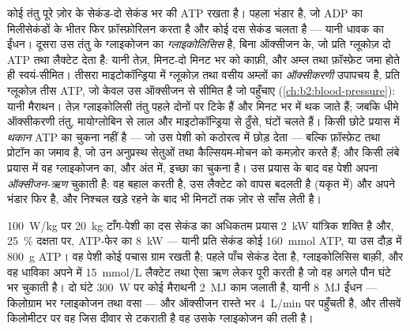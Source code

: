 \begin{proposition}[उस काम का दाम चुकाना]\label{prop:b2:muscle-movement:energy}
कोई तंतु पूरे ज़ोर के सेकंड-दो सेकंड भर की ATP रखता है। पहला
भंडार \emph{} है, जो ADP का
मिलीसेकंडों के भीतर फिर फ़ॉस्फ़ोरिलन करता है और कोई दस सेकंड चलता है --- यानी धावक का
ईंधन। दूसरा उस तंतु के ग्लाइकोजन का \emph{ग्लाइकोलिसिस} है,
बिना ऑक्सीजन के, जो प्रति ग्लूकोज़ दो ATP तथा लैक्टेट देता है: यानी तेज़,
मिनट-दो मिनट भर को काफ़ी, और अम्ल तथा फ़ॉस्फ़ेट जमा होते ही
स्वयं-सीमित। तीसरा माइटोकॉन्ड्रिया में ग्लूकोज़ तथा
वसीय अम्लों का \emph{ऑक्सीकरणी} उपापचय है, प्रति ग्लूकोज़ तीस ATP, जो केवल
उस ऑक्सीजन से सीमित है जो  पहुँचाए
(\cref{ch:b2:blood-pressure}): यानी मैराथन। तेज़ ग्लाइकोलिसी तंतु
पहले दोनों पर टिके हैं और मिनट भर में थक जाते हैं; जबकि धीमे ऑक्सीकरणी तंतु,
मायोग्लोबिन से लाल और माइटोकॉन्ड्रिया से ठुँसे, घंटों चलते हैं।
किसी छोटे प्रयास में \emph{थकान} ATP का चुकना नहीं है ---
जो उस पेशी को कठोरत्व में छोड़ देता --- बल्कि
फ़ॉस्फ़ेट तथा प्रोटॉन का जमाव है, जो उन अनुप्रस्थ सेतुओं तथा
कैल्सियम-मोचन को कमज़ोर करते हैं; और किसी लंबे प्रयास में वह ग्लाइकोजन का, और
अंत में, इच्छा का चुकना है। उस प्रयास के बाद वह पेशी अपना
\emph{ऑक्सीजन-ऋण} चुकाती है: वह  बहाल करती है, उस
लैक्टेट को वापस बदलती है (यकृत में) और अपने भंडार फिर  है, और
निश्चल खड़े रहने के बाद भी मिनटों तक ज़ोर से साँस लेती है।
\end{proposition}

\begin{example}[सौ मीटर]\label{ex:b2:muscle-movement:sprint}
\qty{100}{W/kg} पर \qty{20}{kg} टाँग-पेशी का दस सेकंड का अधिकतम प्रयास
\qty{2}{kW} यांत्रिक शक्ति है और, \qty{25}{\%} दक्षता पर,
ATP-फेर का \qty{8}{kW} --- यानी प्रति सेकंड कोई
\qty{160}{mmol} ATP, या उस दौड़ में \qty{800}{g} ATP।
वह पेशी कोई पचास ग्राम रखती है;  पहले
पाँच सेकंड देता है, ग्लाइकोलिसिस बाक़ी, और वह धाविका अपने  में
\qty{15}{mmol/L} लैक्टेट तथा ऐसा ऋण लेकर पूरी करती है जो वह
अगले पौन घंटे भर चुकाती है। दो घंटे \qty{300}{W} पर कोई मैराथनी
\qty{2}{MJ} काम जलाती है, यानी \qty{8}{MJ} ईंधन --- किलोग्राम भर
ग्लाइकोजन तथा वसा --- और ऑक्सीजन रास्ते भर \qty{4}{L/min} पर
पहुँचती है, और तीसवें किलोमीटर पर वह जिस दीवार से टकराती है वह उसके
ग्लाइकोजन की तली है।
\end{example}

